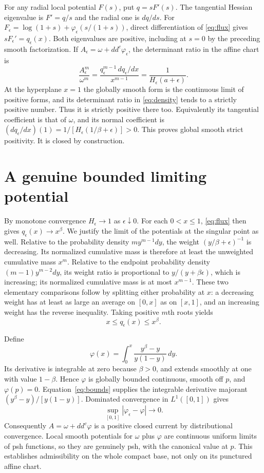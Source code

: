 \documentclass[11pt]{article}
\newcommand{\ddc}{dd^c}
\theoremstyle{remark}\newtheorem{remark}[theorem]{Remark}
\begin{document}
For any radial local potential $F(s)$, put $q=sF'(s)$.
The tangential Hessian eigenvalue is $F'=q/s$ and the radial one is $dq/ds$.
For $F_\epsilon=\log(1+s)+\varphi_\epsilon(s/(1+s))$, direct
differentiation of \eqref{eq:flux} gives $sF_\epsilon'=q_\epsilon(x)$.
Both eigenvalues are positive, including at $s=0$ by the preceding smooth
factorization. If $A_\epsilon=\omega+\ddc\varphi_\epsilon$, the determinant
ratio in the affine chart is
\begin{equation}\label{eq:density}
 \frac{A_\epsilon^m}{\omega^m}
 =\frac{q_\epsilon^{m-1}\,dq_\epsilon/dx}{x^{m-1}}
 =\frac1{H_\epsilon(a+\epsilon)}.
\end{equation}
At the hyperplane $x=1$ the globally smooth form is the continuous limit
of positive forms, and its determinant ratio in \eqref{eq:density} tends
to a strictly positive number. Thus it is strictly positive there too.
Equivalently its tangential coefficient is that of $\omega$, and its normal
coefficient is $(dq_\epsilon/dx)(1)=1/[H_\epsilon(1/\beta+\epsilon)]>0$.
This proves global smooth strict positivity. It is closed by construction.

\section{A genuine bounded limiting potential}
By monotone convergence $H_\epsilon\to1$ as $\epsilon\downarrow0$.
For each $0<x\leq1$, \eqref{eq:flux} then gives
$q_\epsilon(x)\to x^\beta$.
We justify the limit of the potentials at the singular point as well.
Relative to the probability density $m y^{m-1}dy$, the weight
$(y/\beta+\epsilon)^{-1}$ is decreasing. Its normalized cumulative mass
is therefore at least the unweighted cumulative mass $x^m$.
Relative to the endpoint probability density $(m-1)y^{m-2}dy$, its weight
ratio is proportional to $y/(y+\beta\epsilon)$, which is increasing; its
normalized cumulative mass is at most $x^{m-1}$.
These two elementary comparisons follow by splitting either probability
at $x$: a decreasing weight has at least as large an average on $[0,x]$
as on $[x,1]$, and an increasing weight has the reverse inequality.
Taking positive $m$th roots yields
\begin{equation}\label{eq:bounds}
 x\leq q_\epsilon(x)\leq x^\beta.
\end{equation}

Define
\[
 \varphi(x)=\int_0^x\frac{y^\beta-y}{y(1-y)}\,dy.
\]
Its derivative is integrable at zero because $\beta>0$, and extends smoothly
at one with value $1-\beta$. Hence $\varphi$ is globally bounded continuous,
smooth off $p$, and $\varphi(p)=0$.
Equation~\eqref{eq:bounds} supplies the integrable derivative majorant
$(y^\beta-y)/[y(1-y)]$. Dominated convergence in $L^1([0,1])$ gives
\[
 \sup_{[0,1]}|\varphi_\epsilon-\varphi|\longrightarrow0.
\]
Consequently $A=\omega+\ddc\varphi$ is a positive closed current by
distributional convergence. Local smooth potentials for $\omega$ plus
$\varphi$ are continuous uniform limits of psh functions, so they are
genuinely psh, with the canonical value at $p$. This establishes admissibility
on the whole compact base, not only on its punctured affine chart.
\end{document}
